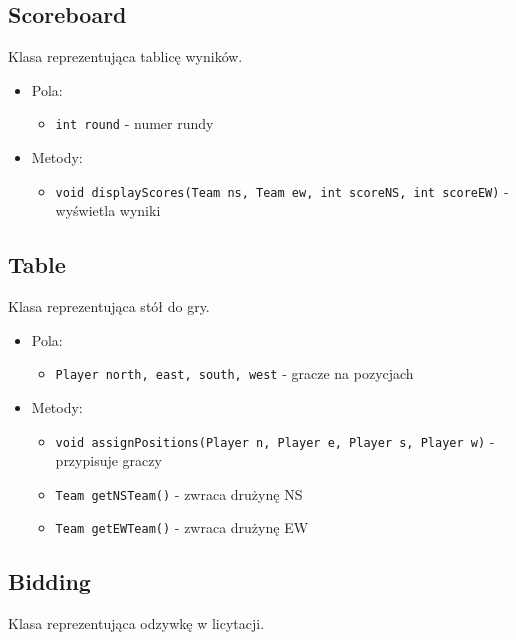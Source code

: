 \documentclass{article}
\begin{document}
\subsection{Scoreboard}
Klasa reprezentująca tablicę wyników.

\begin{itemize}
    \item Pola:
    \begin{itemize}
        \item \texttt{int round} - numer rundy
    \end{itemize}
    
    \item Metody:
    \begin{itemize}
        \item \texttt{void displayScores(Team ns, Team ew, int scoreNS, int scoreEW)} - wyświetla wyniki
    \end{itemize}
\end{itemize}

\subsection{Table}
Klasa reprezentująca stół do gry.

\begin{itemize}
    \item Pola:
    \begin{itemize}
        \item \texttt{Player north, east, south, west} - gracze na pozycjach
    \end{itemize}
    
    \item Metody:
    \begin{itemize}
        \item \texttt{void assignPositions(Player n, Player e, Player s, Player w)} - przypisuje graczy
        \item \texttt{Team getNSTeam()} - zwraca drużynę NS
        \item \texttt{Team getEWTeam()} - zwraca drużynę EW
    \end{itemize}
\end{itemize}

\subsection{Bidding}
Klasa reprezentująca odzywkę w licytacji.
\end{document}
